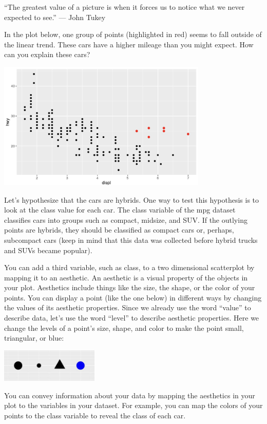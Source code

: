 \documentclass[
  letterpaper,
  DIV=11,
  numbers=noendperiod]{scrreprt}
\begin{document}
``The greatest value of a picture is when it forces us to notice what we
never expected to see.'' --- John Tukey

In the plot below, one group of points (highlighted in red) seems to
fall outside of the linear trend. These cars have a higher mileage than
you might expect. How can you explain these cars?

\includegraphics[width=0.75\textwidth,height=\textheight]{./images/Daily-2-Pic-3.jpg}

Let's hypothesize that the cars are hybrids. One way to test this
hypothesis is to look at the class value for each car. The class
variable of the mpg dataset classifies cars into groups such as compact,
midsize, and SUV. If the outlying points are hybrids, they should be
classified as compact cars or, perhaps, subcompact cars (keep in mind
that this data was collected before hybrid trucks and SUVs became
popular).

You can add a third variable, such as class, to a two dimensional
scatterplot by mapping it to an aesthetic. An aesthetic is a visual
property of the objects in your plot. Aesthetics include things like the
size, the shape, or the color of your points. You can display a point
(like the one below) in different ways by changing the values of its
aesthetic properties. Since we already use the word ``value'' to
describe data, let's use the word ``level'' to describe aesthetic
properties. Here we change the levels of a point's size, shape, and
color to make the point small, triangular, or blue:

\includegraphics[width=0.35\textwidth,height=\textheight]{./images/Daily-2-Pic-4.jpg}

You can convey information about your data by mapping the aesthetics in
your plot to the variables in your dataset. For example, you can map the
colors of your points to the class variable to reveal the class of each
car.
\end{document}
